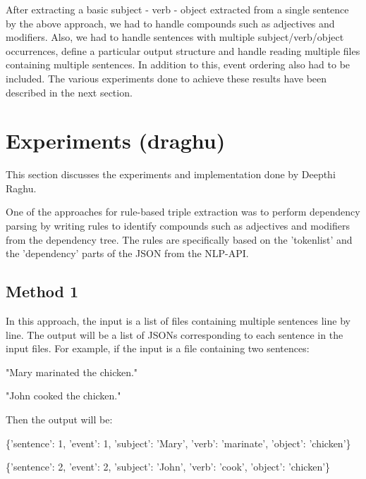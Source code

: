 \documentclass[11pt,letterpaper]{article}
\begin{document}
After extracting a basic subject - verb - object extracted from a single sentence by the above approach, we had to handle compounds such as adjectives and modifiers. Also, we had to handle sentences with multiple subject/verb/object occurrences, define a particular output structure and handle reading multiple files containing multiple sentences. In addition to this, event ordering also had to be included. The various experiments done to achieve these results have been described in the next section. 

\section{Experiments (draghu)}
This section discusses the experiments and implementation done by Deepthi Raghu.

\noindent
One of the approaches for rule-based triple extraction was to perform dependency parsing by writing rules to identify compounds such as adjectives and modifiers from the dependency tree. The rules are specifically based on the 'tokenlist' and the 'dependency' parts of the JSON from the NLP-API. 

\subsection{Method 1}
In this approach, the input is a list of files containing multiple sentences line by line. The output will be a list of JSONs corresponding to each sentence in the input files. For example, if the input is a file containing two sentences:

"Mary marinated the chicken." 

"John cooked the chicken."

\noindent \newline
Then the output will be:

\{'sentence': 1, 'event': 1, 'subject': 'Mary', 'verb': 'marinate', 'object': 'chicken'\}

\{'sentence': 2, 'event': 2, 'subject': 'John', 'verb': 'cook', 'object': 'chicken'\}
\end{document}
